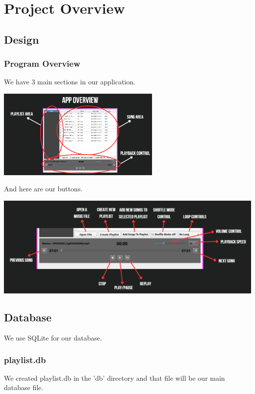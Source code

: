 \documentclass[12pt]{report} %
\begin{document}
\chapter{Project Overview}
\section{Design}

\subsection{Program Overview}


\hspace{1cm}We have 3 main sections in our application.


\includegraphics[width=0.6\textwidth]{images/app_overview.png} %

And here are our buttons.

\includegraphics[height=0.25\textwidth]{images/btns.png} %

\newpage

\section{Database}

\hspace{1cm}We use SQLite for our database.

\subsection{playlist.db}

\hspace{1cm}We created playlist.db in the 'db' directory and that file will
be our main database file.
\end{document}
